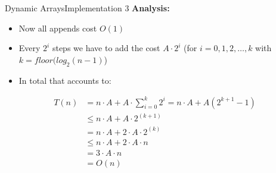 
\begin{frame}{Dynamic Arrays}{Implementation 3}
  \textbf{Analysis:}
  \begin{itemize}
    \item
      Now all appends cost $O(1)$ 
    \item
      Every $2^i$ steps we have to add the cost $A \cdot 2^i$
      (for $i = 0, 1, 2, \dots,k$ with $k=floor(log_2(n-1)$)
    \item
      In total that accounts to:
  \end{itemize}
  \begin{align*}
    T(n) &= n \cdot A + A \cdot \sum_{i=0}^{k} 2^i = n \cdot A + A (2^{k+1}-1)\\
    {} &\leq n \cdot A + A \cdot 2^{(k+1)}\\
    {} &= n \cdot A + 2 \cdot A \cdot 2^{(k)}\\
    {} &\leq n \cdot A + 2 \cdot A \cdot n\\
    {} &= 3 \cdot A \cdot n\\
    {} &= O(n)
  \end{align*}
\end{frame}



